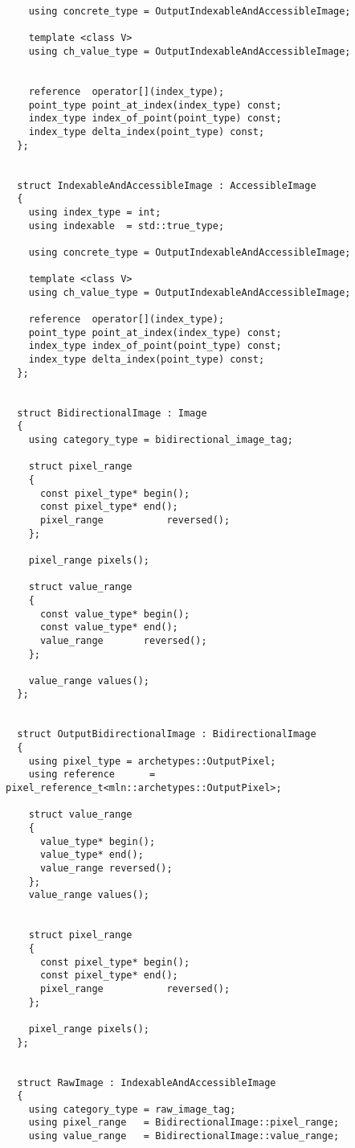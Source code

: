 \begin{verbatim}
    using concrete_type = OutputIndexableAndAccessibleImage;

    template <class V>
    using ch_value_type = OutputIndexableAndAccessibleImage;


    reference  operator[](index_type);
    point_type point_at_index(index_type) const;
    index_type index_of_point(point_type) const;
    index_type delta_index(point_type) const;
  };


  struct IndexableAndAccessibleImage : AccessibleImage
  {
    using index_type = int;
    using indexable  = std::true_type;

    using concrete_type = OutputIndexableAndAccessibleImage;

    template <class V>
    using ch_value_type = OutputIndexableAndAccessibleImage;

    reference  operator[](index_type);
    point_type point_at_index(index_type) const;
    index_type index_of_point(point_type) const;
    index_type delta_index(point_type) const;
  };


  struct BidirectionalImage : Image
  {
    using category_type = bidirectional_image_tag;

    struct pixel_range
    {
      const pixel_type* begin();
      const pixel_type* end();
      pixel_range           reversed();
    };

    pixel_range pixels();

    struct value_range
    {
      const value_type* begin();
      const value_type* end();
      value_range       reversed();
    };

    value_range values();
  };


  struct OutputBidirectionalImage : BidirectionalImage
  {
    using pixel_type = archetypes::OutputPixel;
    using reference      = pixel_reference_t<mln::archetypes::OutputPixel>;

    struct value_range
    {
      value_type* begin();
      value_type* end();
      value_range reversed();
    };
    value_range values();


    struct pixel_range
    {
      const pixel_type* begin();
      const pixel_type* end();
      pixel_range           reversed();
    };

    pixel_range pixels();
  };


  struct RawImage : IndexableAndAccessibleImage
  {
    using category_type = raw_image_tag;
    using pixel_range   = BidirectionalImage::pixel_range;
    using value_range   = BidirectionalImage::value_range;


\end{verbatim}
